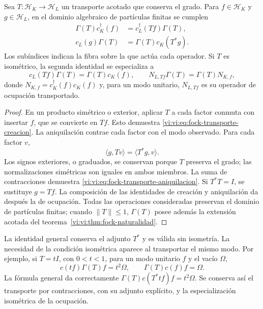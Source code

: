 \begin{proposition}
\label{vi:vi:prop:fock-transporte-adjunto}
Sea \(T:\mathcal H_K\to\mathcal H_L\) un transporte acotado
que conserva el grado. Para \(f\in\mathcal H_K\) y
\(g\in\mathcal H_L\), en el dominio algebraico de partículas
finitas se cumplen
\begin{align}
 \Gamma(T)c_K^\dagger(f)
 &=c_L^\dagger(Tf)\Gamma(T),
 \label{vi:vi:eq:fock-transporte-creacion}\\
 c_L(g)\Gamma(T)
 &=\Gamma(T)c_K(T^*g).
 \label{vi:vi:eq:fock-transporte-aniquilacion}
\end{align}
Los subíndices indican la fibra sobre la que actúa cada operador.
Si \(T\) es isométrico, la segunda identidad se especializa a
\[
 c_L(Tf)\Gamma(T)=\Gamma(T)c_K(f),
 \qquad
 N_{L,Tf}\Gamma(T)=\Gamma(T)N_{K,f},
\]
donde \(N_{K,f}=c_K^\dagger(f)c_K(f)\) y, para un modo unitario,
\(N_{L,Tf}\) es su operador de ocupación transportado.
\end{proposition}
\begin{proof}
En un producto simétrico o exterior, aplicar \(T\) a cada factor
conmuta con insertar \(f\), que se convierte en \(Tf\). Esto
demuestra \eqref{vi:vi:eq:fock-transporte-creacion}. La aniquilación
contrae cada factor con el modo observado. Para cada factor \(v\),
\[
 \langle g,Tv\rangle=\langle T^*g,v\rangle.
\]
Los signos exteriores, o graduados, se conservan porque \(T\)
preserva el grado; las normalizaciones simétricas son iguales en
ambos miembros. La suma de contracciones demuestra
\eqref{vi:vi:eq:fock-transporte-aniquilacion}. Si \(T^*T=I\), se
sustituye \(g=Tf\). La composición de las identidades de creación
y aniquilación da después la de ocupación. Todas las operaciones
consideradas preservan el dominio de partículas finitas; cuando
\(\|T\|\le1\), \(\Gamma(T)\) posee además la extensión acotada
del teorema~\ref{vi:vi:thm:fock-naturalidad}.
\end{proof}

La identidad general conserva el adjunto \(T^*\) y es válida sin
isometría. La necesidad de la condición isométrica aparece al
transportar el mismo modo. Por ejemplo, si \(T=tI\), con
\(0<t<1\), para un modo unitario \(f\) y el vacío \(\Omega\),
\[
 c(tf)\Gamma(T)f=t^2\Omega,
 \qquad \Gamma(T)c(f)f=\Omega.
\]
La fórmula general da correctamente
\(\Gamma(T)c(T^*tf)f=t^2\Omega\). Se conserva así el
transporte por contracciones, con su adjunto explícito, y la
especialización isométrica de la ocupación.

